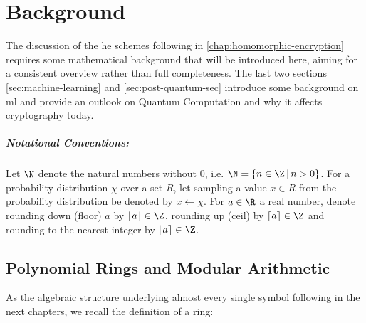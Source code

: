\chapter{Background}
\label{chap:background}
\vspace{-1cm}

The discussion of the \gls{he} schemes following in \autoref{chap:homomorphic-encryption} requires some mathematical background that will be introduced here, aiming for a consistent overview rather than full completeness.
The last two sections \ref{sec:machine-learning} and \ref{sec:post-quantum-sec} introduce some background on \glsdesc{ml} and provide an outlook on Quantum Computation and why it affects cryptography today.

\paragraph{Notational Conventions:}
Let $\N$ denote the natural numbers without $0$, i.e. $\N = \{n \in \Z \,|\, n > 0\}$.
For a probability distribution $\chi$ over a set $R$, let sampling a value $x \in R$ from the probability distribution be denoted by $x \leftarrow \chi$.
For $a \in \R$ a real number, denote rounding down (floor) $a$ by $\lfloor a \rfloor \in \Z$,
rounding up (ceil) by $\lceil a \rceil \in \Z$ and rounding to the nearest integer by
$\lfloor a \rceil \in \Z$.

\section{Polynomial Rings and Modular Arithmetic}
As the algebraic structure underlying almost every single symbol following in the next chapters, we recall the definition of a ring:

